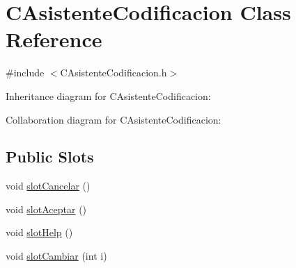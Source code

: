 \hypertarget{classCAsistenteCodificacion}{}\section{C\+Asistente\+Codificacion Class Reference}
\label{classCAsistenteCodificacion}


{\ttfamily \#include $<$C\+Asistente\+Codificacion.\+h$>$}



Inheritance diagram for C\+Asistente\+Codificacion\+:


Collaboration diagram for C\+Asistente\+Codificacion\+:
\subsection*{Public Slots}
\begin{DoxyCompactItemize}
\item 
void \hyperlink{classCAsistenteCodificacion_ab7f28d6c6468d1c92a85c655892d31f2}{slot\+Cancelar} ()
\item 
void \hyperlink{classCAsistenteCodificacion_a64f692a920d95d1f482d52b57d865915}{slot\+Aceptar} ()
\item 
void \hyperlink{classCAsistenteCodificacion_a55c2125eb7a4cd4e48647976f21ad165}{slot\+Help} ()
\item 
void \hyperlink{classCAsistenteCodificacion_ae1301ca578c8c5a8a90f26eb1a99110d}{slot\+Cambiar} (int i)
\end{DoxyCompactItemize}
